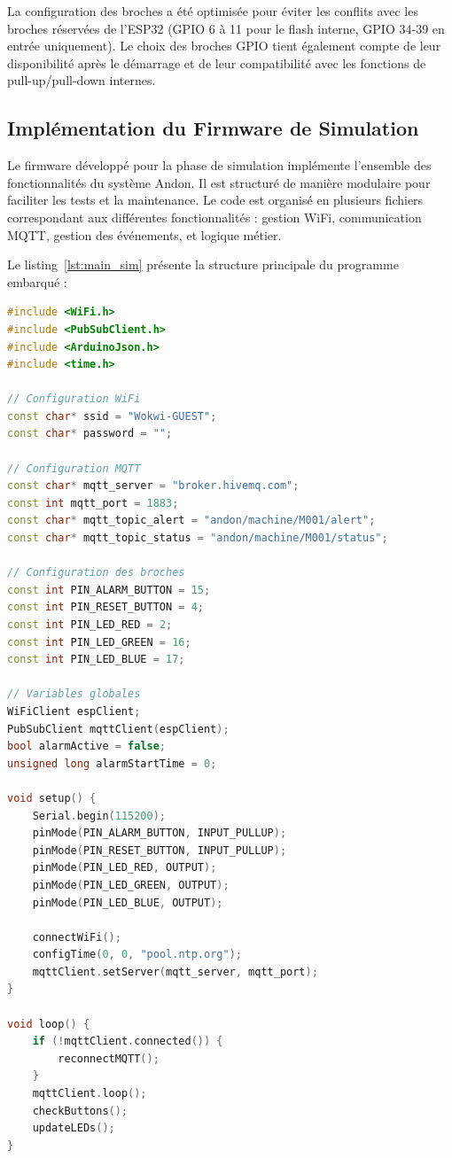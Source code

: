 La configuration des broches a été optimisée pour éviter les conflits avec les broches réservées de l'ESP32 (GPIO 6 à 11 pour le flash interne, GPIO 34-39 en entrée uniquement). Le choix des broches GPIO tient également compte de leur disponibilité après le démarrage et de leur compatibilité avec les fonctions de pull-up/pull-down internes.

\subsection{Implémentation du Firmware de Simulation}
\label{subsec:impl_firmware_sim}

Le firmware développé pour la phase de simulation implémente l'ensemble des fonctionnalités du système Andon. Il est structuré de manière modulaire pour faciliter les tests et la maintenance. Le code est organisé en plusieurs fichiers correspondant aux différentes fonctionnalités : gestion WiFi, communication MQTT, gestion des événements, et logique métier.

Le listing~\ref{lst:main_sim} présente la structure principale du programme embarqué :

\begin{lstlisting}[language=C++, caption={Structure principale du firmware ESP32}, label={lst:main_sim}, captionpos=b]
#include <WiFi.h>
#include <PubSubClient.h>
#include <ArduinoJson.h>
#include <time.h>

// Configuration WiFi
const char* ssid = "Wokwi-GUEST";
const char* password = "";

// Configuration MQTT
const char* mqtt_server = "broker.hivemq.com";
const int mqtt_port = 1883;
const char* mqtt_topic_alert = "andon/machine/M001/alert";
const char* mqtt_topic_status = "andon/machine/M001/status";

// Configuration des broches
const int PIN_ALARM_BUTTON = 15;
const int PIN_RESET_BUTTON = 4;
const int PIN_LED_RED = 2;
const int PIN_LED_GREEN = 16;
const int PIN_LED_BLUE = 17;

// Variables globales
WiFiClient espClient;
PubSubClient mqttClient(espClient);
bool alarmActive = false;
unsigned long alarmStartTime = 0;

void setup() {
    Serial.begin(115200);
    pinMode(PIN_ALARM_BUTTON, INPUT_PULLUP);
    pinMode(PIN_RESET_BUTTON, INPUT_PULLUP);
    pinMode(PIN_LED_RED, OUTPUT);
    pinMode(PIN_LED_GREEN, OUTPUT);
    pinMode(PIN_LED_BLUE, OUTPUT);
    
    connectWiFi();
    configTime(0, 0, "pool.ntp.org");
    mqttClient.setServer(mqtt_server, mqtt_port);
}

void loop() {
    if (!mqttClient.connected()) {
        reconnectMQTT();
    }
    mqttClient.loop();
    checkButtons();
    updateLEDs();
}
\end{lstlisting}

